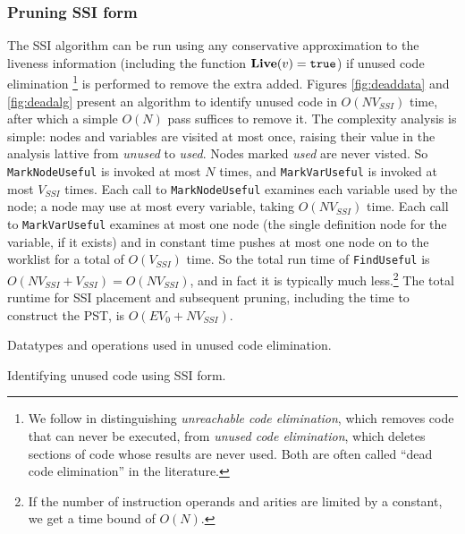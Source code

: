 \documentclass[12pt,titlepage]{article}
\begin{document}
\subsubsection{Pruning SSI form}\label{sec:unusedcode}
The SSI algorithm can be run using any conservative approximation to
the liveness information
(including the function $\text{\bf Live}(v)=\text{\tt true}$) if
unused code elimination%
\footnote{We follow \cite{wegman91:scc} in distinguishing
\emph{unreachable code elimination}, which removes code that can never
be executed, from \emph{unused code elimination}, which deletes
sections of code whose results are never used.  Both are often called
``dead code elimination'' in the literature.}  is performed to remove
the extra  added.  Figures \ref{fig:deaddata} and
\ref{fig:deadalg} present an algorithm to identify unused code in
$O(N V_{SSI})$ time, after which a simple $O(N)$ pass suffices to remove it.
The complexity analysis is simple: nodes and variables are visited at
most once, raising their value in the analysis lattive from
\emph{unused} to \emph{used}.  Nodes marked \emph{used} are never
visted.  So \texttt{MarkNodeUseful} is invoked at most $N$ times, and
\texttt{MarkVarUseful} is invoked at most $V_{SSI}$ times.  Each call to
\texttt{MarkNodeUseful} examines each variable used by the node; a
node may use at most every variable, taking $O(N V_{SSI})$ time.  Each call
to \texttt{MarkVarUseful} examines at most one node (the single
definition node for the variable, if it exists) and in constant time
pushes at most one node on to the worklist for a total of $O(V_{SSI})$ time.
So the total run time of \texttt{FindUseful} is
$O(N V_{SSI}+V_{SSI})=O(N V_{SSI})$, and
in fact it is typically much less.\footnote{If the number of instruction
operands and \phisigfunction{} arities are limited by a
constant, we get a time bound of $O(N)$.}  The total runtime for SSI
placement and subsequent pruning, including the time to construct the
PST, is $O(EV_0 + NV_{SSI})$.

\begin{myfigure}\small

\caption{Datatypes and operations used in unused code elimination.}
\label{fig:deaddata}
\end{myfigure}

\begin{myfigure}\small\linespread{0.75}

\caption{Identifying unused code using SSI form.}
\label{fig:deadalg}
\end{myfigure}
\end{document}
